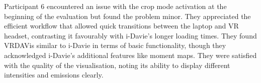 

Participant 6 encountered an issue with the crop mode activation at the beginning of the evaluation but found the problem minor. 
They appreciated the efficient workflow that allowed quick transitions between the laptop and VR headset, contrasting it favourably with i-Davie’s longer loading times. 
They found VRDAVis similar to i-Davie in terms of basic functionality, though they acknowledged i-Davie’s additional features like moment maps. 
They were satisfied with the quality of the visualisation, noting its ability to display different intensities and emissions clearly.








